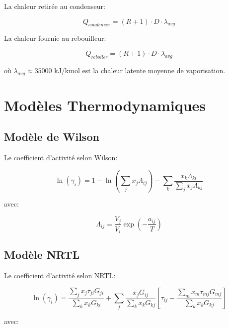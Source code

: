 \documentclass[11pt,a4paper]{article}
\begin{document}
La chaleur retirée au condenseur:

\begin{equation}
Q_{condenser} = (R + 1) \cdot D \cdot \lambda_{avg}
\end{equation}

La chaleur fournie au rebouilleur:

\begin{equation}
Q_{reboiler} = (R + 1) \cdot D \cdot \lambda_{avg}
\end{equation}

où $\lambda_{avg} \approx 35000$ kJ/kmol est la chaleur latente moyenne de vaporisation.

\section{Modèles Thermodynamiques}

\subsection{Modèle de Wilson}

Le coefficient d'activité selon Wilson:

\begin{equation}
\ln(\gamma_i) = 1 - \ln\left(\sum_j x_j \Lambda_{ij}\right) - \sum_k \frac{x_k \Lambda_{ki}}{\sum_j x_j \Lambda_{kj}}
\end{equation}

avec:

\begin{equation}
\Lambda_{ij} = \frac{V_j}{V_i} \exp\left(-\frac{a_{ij}}{T}\right)
\end{equation}

\subsection{Modèle NRTL}

Le coefficient d'activité selon NRTL:

\begin{equation}
\ln(\gamma_i) = \frac{\sum_j x_j \tau_{ji} G_{ji}}{\sum_k x_k G_{ki}} + \sum_j \frac{x_j G_{ij}}{\sum_k x_k G_{kj}} \left[\tau_{ij} - \frac{\sum_m x_m \tau_{mj} G_{mj}}{\sum_k x_k G_{kj}}\right]
\end{equation}

avec:
\end{document}
